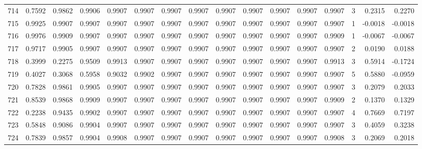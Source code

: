 \begin{tabular}{lrrrrrrrrrrrrrrr}
714 &      0.7592 &  0.9862 &  0.9906 &  0.9907 &  0.9907 &  0.9907 &  0.9907 &  0.9907 &  0.9907 &  0.9907 &   0.9907 &     0.9907 &      3 &                    0.2315 &                     0.2270 \\
715 &      0.9925 &  0.9907 &  0.9907 &  0.9907 &  0.9907 &  0.9907 &  0.9907 &  0.9907 &  0.9907 &  0.9907 &   0.9907 &     0.9907 &      1 &                   -0.0018 &                    -0.0018 \\
716 &      0.9976 &  0.9909 &  0.9907 &  0.9907 &  0.9907 &  0.9907 &  0.9907 &  0.9907 &  0.9907 &  0.9907 &   0.9907 &     0.9909 &      1 &                   -0.0067 &                    -0.0067 \\
717 &      0.9717 &  0.9905 &  0.9907 &  0.9907 &  0.9907 &  0.9907 &  0.9907 &  0.9907 &  0.9907 &  0.9907 &   0.9907 &     0.9907 &      2 &                    0.0190 &                     0.0188 \\
718 &      0.3999 &  0.2275 &  0.9509 &  0.9913 &  0.9907 &  0.9907 &  0.9907 &  0.9907 &  0.9907 &  0.9907 &   0.9907 &     0.9913 &      3 &                    0.5914 &                    -0.1724 \\
719 &      0.4027 &  0.3068 &  0.5958 &  0.9032 &  0.9902 &  0.9907 &  0.9907 &  0.9907 &  0.9907 &  0.9907 &   0.9907 &     0.9907 &      5 &                    0.5880 &                    -0.0959 \\
720 &      0.7828 &  0.9861 &  0.9905 &  0.9907 &  0.9907 &  0.9907 &  0.9907 &  0.9907 &  0.9907 &  0.9907 &   0.9907 &     0.9907 &      3 &                    0.2079 &                     0.2033 \\
721 &      0.8539 &  0.9868 &  0.9909 &  0.9907 &  0.9907 &  0.9907 &  0.9907 &  0.9907 &  0.9907 &  0.9907 &   0.9907 &     0.9909 &      2 &                    0.1370 &                     0.1329 \\
722 &      0.2238 &  0.9435 &  0.9902 &  0.9907 &  0.9907 &  0.9907 &  0.9907 &  0.9907 &  0.9907 &  0.9907 &   0.9907 &     0.9907 &      4 &                    0.7669 &                     0.7197 \\
723 &      0.5848 &  0.9086 &  0.9904 &  0.9907 &  0.9907 &  0.9907 &  0.9907 &  0.9907 &  0.9907 &  0.9907 &   0.9907 &     0.9907 &      3 &                    0.4059 &                     0.3238 \\
724 &      0.7839 &  0.9857 &  0.9904 &  0.9908 &  0.9907 &  0.9907 &  0.9907 &  0.9907 &  0.9907 &  0.9907 &   0.9907 &     0.9908 &      3 &                    0.2069 &                     0.2018 \\

\end{tabular}
